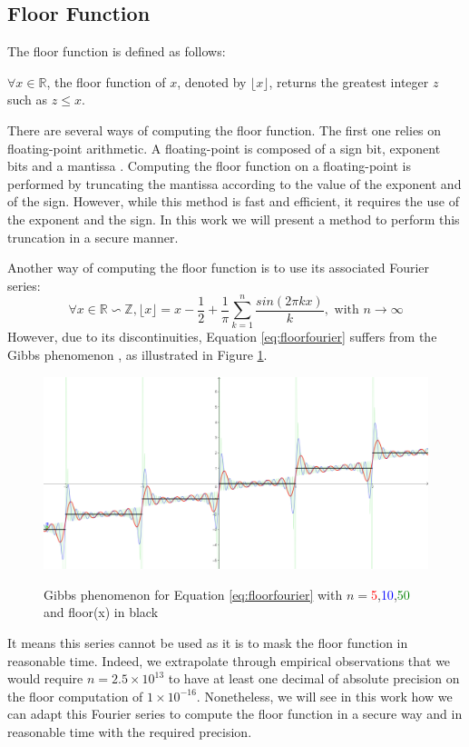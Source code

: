 \documentclass[runningheads]{llncs}
\begin{document}
\subsection{Floor Function}\label{subsec:floorfunction}
The floor function is defined as follows:
\begin{definition}\label{def:floorfunction}
  $\forall x \in \mathbb{R}$, the floor function of $x$, denoted by $\lfloor x \rfloor$, returns the greatest integer $z$ such as $z\leq x$.
\end{definition}
There are several ways of computing the floor function. The first one relies on floating-point arithmetic. A floating-point is composed of a sign bit, exponent bits and a mantissa \cite{kahan1996ieee}. Computing the floor function on a floating-point is performed by truncating the mantissa according to the value of the exponent and of the sign. However, while this method is fast and efficient, it requires the use of the exponent and the sign. In this work we will present a method to perform this truncation in a secure manner.

\medskip

\noindent Another way of computing the floor function is to use its associated Fourier series:\begin{equation}\label{eq:floorfourier}
  \forall x \in \mathbb{R}\backsim \mathbb{Z}, \lfloor x\rfloor = x - \frac{1}{2} + \frac{1}{\pi}\sum_{k=1}^n \frac{sin(2\pi kx)}{k},\text{ with }n\rightarrow \infty
\end{equation}
However, due to its discontinuities, Equation \ref{eq:floorfourier} suffers from the Gibbs phenomenon \cite{8e44e918-40ae-3857-bb25-dc12ccf9e7c3}, as illustrated in Figure \ref{fig:gibbs}. 
\begin{figure}[!h]
  \includegraphics[width=\textwidth]{figure/gibbsphenomenon.png}
  \label{fig:gibbs}
  \caption{Gibbs phenomenon for Equation \ref{eq:floorfourier} with $n=$\textcolor{red}{5},\textcolor{blue}{10},\textcolor{green}{50} and floor(x) in black}
\end{figure}
It means this series cannot be used as it is to mask the floor function in reasonable time. Indeed, we extrapolate through empirical observations that we would require $n=\num{2.5}\times 10^{13}$ to have at least one decimal of absolute precision on the floor computation of $1\times 10^{-16}$. Nonetheless, we will see in this work how we can adapt this Fourier series to compute the floor function in a secure way and in reasonable time with the required precision.
\end{document}

